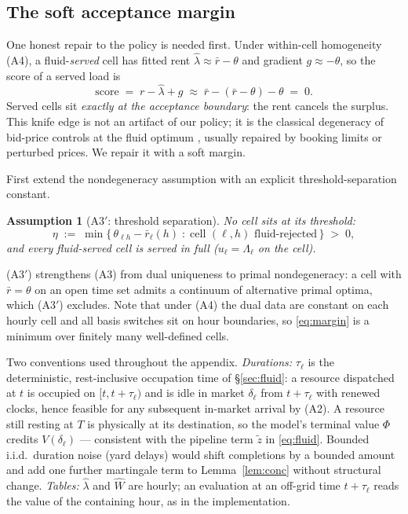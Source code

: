 \documentclass[11pt]{article}
\newtheorem{assumption}{Assumption}
\begin{document}
\subsection{The soft acceptance margin}
\label{sec:margin}

One honest repair to the policy is needed first. Under within-cell
homogeneity (A4), a fluid-\emph{served} cell has fitted rent
$\hat{\lambda} \approx \bar{r} - \theta$ and gradient
$g \approx -\theta$, so the score of a served load is
\begin{equation}
  \mathrm{score} \;=\; r - \hat{\lambda} + g
  \;\approx\; \bar{r} - (\bar{r} - \theta) - \theta \;=\; 0.
\end{equation}
Served cells sit \emph{exactly at the acceptance boundary}: the rent
cancels the surplus. This knife edge is not an artifact of our policy;
it is the classical degeneracy of bid-price controls at the fluid
optimum \citep{talluri1998bidprice}, usually repaired by booking limits
or perturbed prices. We repair it with a soft margin.

First extend the nondegeneracy assumption with an explicit
threshold-separation constant.

\begin{assumption}[A3$'$: threshold separation]
\label{ass:sep}
No cell sits at its threshold:
\begin{equation}
  \eta \;:=\; \min \bigl\{\, \theta_{\ell h} - \bar{r}_{\ell}(h)
  \;:\; \text{cell } (\ell, h) \text{ fluid-rejected} \,\bigr\}
  \;>\; 0,
  \label{eq:margin}
\end{equation}
and every fluid-served cell is served in full
($u_{\ell} = \Lambda_{\ell}$ on the cell).
\end{assumption}

(A3$'$) strengthens (A3) from dual uniqueness to primal
nondegeneracy: a cell with $\bar{r} = \theta$ on an open time set
admits a continuum of alternative primal optima, which (A3$'$)
excludes. Note that under (A4) the dual data are constant on each
hourly cell and all basis switches sit on hour boundaries, so
\eqref{eq:margin} is a minimum over finitely many well-defined cells.

Two conventions used throughout the appendix. \emph{Durations:}
$\tau_{\ell}$ is the deterministic, rest-inclusive occupation time of
\S\ref{sec:fluid}: a resource dispatched at $t$ is occupied on
$[t, t + \tau_{\ell})$ and is idle in market $\delta_{\ell}$ from
$t + \tau_{\ell}$ with renewed clocks, hence feasible for any
subsequent in-market arrival by (A2). A resource still resting at $T$
is physically at its destination, so the model's terminal value
$\Phi$ credits $V(\delta_{\ell})$ --- consistent with the pipeline
term $\tilde{z}$ in \eqref{eq:fluid}. Bounded i.i.d.\ duration noise
(yard delays) would shift completions by a bounded amount and add one
further martingale term to Lemma~\ref{lem:conc} without structural
change. \emph{Tables:} $\hat{\lambda}$ and $\widehat{W}$ are hourly;
an evaluation at an off-grid time $t + \tau_{\ell}$ reads the value of
the containing hour, as in the implementation.
\end{document}
